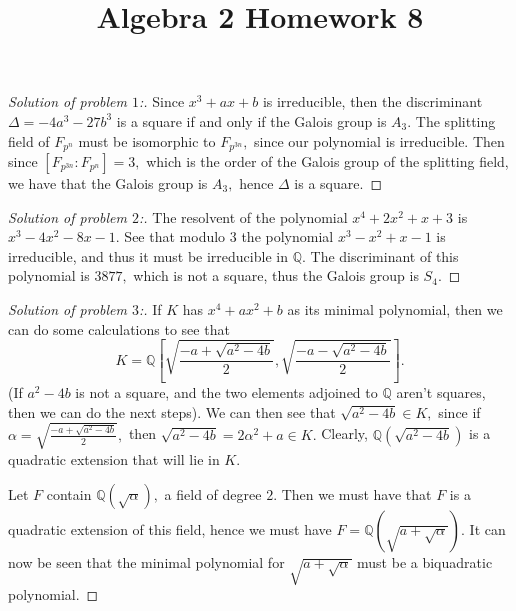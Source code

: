 \documentclass[letterpaper,11pt,twoside]{article}
\title{Algebra 2 Homework 8}
\theoremstyle{proposition}
\theoremstyle{definition}
\theoremstyle{theorem}
\theoremstyle{definition}
\theoremstyle{definition}
\theoremstyle{definition}
\theoremstyle{lemma}
\theoremstyle{definition}
\theoremstyle{definition}
\theoremstyle{corollary}
\theoremstyle{definition}
\theoremstyle{definition}
\theoremstyle{definition}
\begin{document}
	\maketitle
	\begin{proof}[Solution of problem $1$:]
		Since $x^3+ax+b$ is irreducible, then the discriminant $\Delta= -4a^3-27b^3$ is a square if and only if the Galois group is $A_3.$ The splitting 
		field of $F_{p^n}$ must be isomorphic to $F_{p^{3n}},$ since our polynomial is irreducible. Then since $[F_{p^{3n}}:F_{p^{n}}]=3,$ which is the 
		order of the Galois group of the splitting field, we have that the Galois group is $A_3,$ hence $\Delta$ is a square. 
	\end{proof}
	\begin{proof}[Solution of problem $2$:]
		The resolvent of the polynomial $x^4+2x^2+x+3$ is $ x^3-4x^2-8x-1.$ See that modulo $3$ the polynomial $x^3-x^2+x-1$ is irreducible, and thus it 
		must be irreducible in $\mathbb{Q}.$ The discriminant of this polynomial is $3877,$ which is not a square, thus the Galois group is $S_4.$ 
	\end{proof}
	\begin{proof}[Solution of problem $3$:]
	If $K$ has $x^4+ax^2+b$ as its minimal polynomial, then we can do some calculations to see that $$K= \mathbb{Q} \left[ \sqrt{ \frac{-a + 
	\sqrt{a^2-4b}}{2} }, \sqrt{ \frac{-a - \sqrt{a^2-4b}}{2} } \right].$$ (If $a^2-4b$ is not a square, and the two elements adjoined to $\mathbb{Q}$ aren't 
	squares, then we can do the next steps). We can then see that $\sqrt{a^2-4b} \in K,$ since if $\alpha= \sqrt{ \frac{-a + \sqrt{a^2-4b}}{2} },$ then $ 
	\sqrt{a^2-4b} = 2\alpha^2 + a \in K.$ Clearly, $\mathbb{Q}( \sqrt{a^2-4b} )$ is a quadratic extension that will lie in $K.$ 

	Let $F$ contain $\mathbb{Q}(\sqrt{\alpha}),$ a field of degree $2.$ Then we must have that $F$ is a quadratic extension of this field, hence we must 
	have $ F= \mathbb{Q}( \sqrt{a+ \sqrt{\alpha}}).$ It can now be seen that the minimal polynomial for $\sqrt{a+ \sqrt{\alpha}}$ must be a biquadratic 
	polynomial.
	\end{proof}
\end{document}
